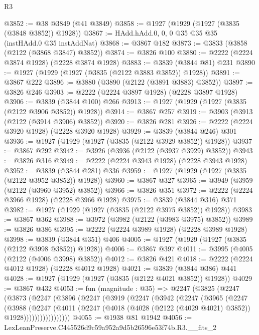 \begin{lexlean}{R3}
\begin{coremodule}
@3852 := @38 @3849 (@41 @3849)
@3858 := @1927 (@1929 (@1927 (@3835 (@3848 @3852)) @1928))
@3867 := HAdd.hAdd.{0, 0, 0} @35 @35 @35 (instHAdd.{0} @35 instAddNat)
@3868 := @3867 @182
@3873 := @3833 (@3858 (@2122 (@3868 @3847) @3852))
@3874 := @3826 @100
@3880 := @2222 (@2224 @3874 @1928) (@2228 @3874 @1928)
@3883 := @3839 (@3844 @81) @231
@3890 := @1927 (@1929 (@1927 (@3835 (@2122 @3883 @3852)) @1928))
@3891 := @3867 @222
@3896 := @3880 (@3890 (@2122 (@3891 @3883) @3852))
@3897 := @3826 @246
@3903 := @2222 (@2224 @3897 @1928) (@2228 @3897 @1928)
@3906 := @3839 (@3844 @100) @266
@3913 := @1927 (@1929 (@1927 (@3835 (@2122 @3906 @3852)) @1928))
@3914 := @3867 @257
@3919 := @3903 (@3913 (@2122 (@3914 @3906) @3852))
@3920 := @3826 @281
@3926 := @2222 (@2224 @3920 @1928) (@2228 @3920 @1928)
@3929 := @3839 (@3844 @246) @301
@3936 := @1927 (@1929 (@1927 (@3835 (@2122 @3929 @3852)) @1928))
@3937 := @3867 @292
@3942 := @3926 (@3936 (@2122 (@3937 @3929) @3852))
@3943 := @3826 @316
@3949 := @2222 (@2224 @3943 @1928) (@2228 @3943 @1928)
@3952 := @3839 (@3844 @281) @336
@3959 := @1927 (@1929 (@1927 (@3835 (@2122 @3952 @3852)) @1928))
@3960 := @3867 @327
@3965 := @3949 (@3959 (@2122 (@3960 @3952) @3852))
@3966 := @3826 @351
@3972 := @2222 (@2224 @3966 @1928) (@2228 @3966 @1928)
@3975 := @3839 (@3844 @316) @371
@3982 := @1927 (@1929 (@1927 (@3835 (@2122 @3975 @3852)) @1928))
@3983 := @3867 @362
@3988 := @3972 (@3982 (@2122 (@3983 @3975) @3852))
@3989 := @3826 @386
@3995 := @2222 (@2224 @3989 @1928) (@2228 @3989 @1928)
@3998 := @3839 (@3844 @351) @406
@4005 := @1927 (@1929 (@1927 (@3835 (@2122 @3998 @3852)) @1928))
@4006 := @3867 @397
@4011 := @3995 (@4005 (@2122 (@4006 @3998) @3852))
@4012 := @3826 @421
@4018 := @2222 (@2224 @4012 @1928) (@2228 @4012 @1928)
@4021 := @3839 (@3844 @386) @441
@4028 := @1927 (@1929 (@1927 (@3835 (@2122 @4021 @3852)) @1928))
@4029 := @3867 @432
@4053 := fun (magnitude : @35) =>
  @2247
    (@3825
      (@2247
        (@3873
          (@2247
            (@3896
              (@2247
                (@3919
                  (@2247
                    (@3942
                      (@2247
                        (@3965
                          (@2247
                            (@3988
                              (@2247
                                (@4011
                                  (@2247
                                    (@4018
                                      (@4028 (@2122 (@4029 @4021) @3852))
                                      @1928)))))))))))))))))
@4055 := @1938 @81 @1942
@4056 := LexLeanPreserve.C445526d9c59a952a9d5b26596e53f74b.R3.__fits_2

\end{coremodule}
\end{lexlean}

